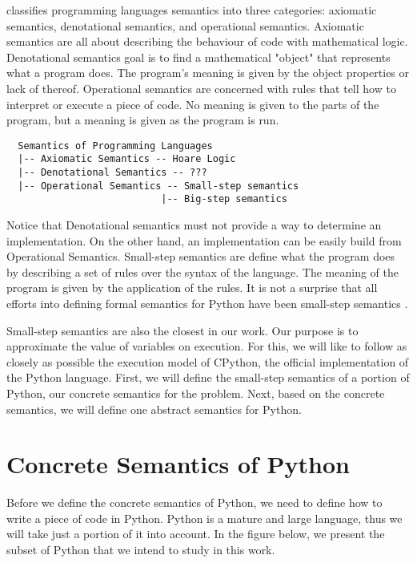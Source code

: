 \textcite{mitchell1996foundations} classifies programming
languages semantics into three categories: axiomatic semantics, denotational semantics,
and operational semantics. Axiomatic semantics are all about describing the behaviour of
code with mathematical logic. Denotational semantics goal is to find a mathematical
"object" that represents what a program does. The program's meaning is given by the
object properties or lack of thereof. Operational semantics are concerned with rules that
tell how to interpret or execute a piece of code. No meaning is given to the parts of the
program, but a meaning is given as the program is run.


\begin{verbatim}
  Semantics of Programming Languages
  |-- Axiomatic Semantics -- Hoare Logic
  |-- Denotational Semantics -- ???
  |-- Operational Semantics -- Small-step semantics
                           |-- Big-step semantics
\end{verbatim}

Notice that Denotational semantics must not provide a way to determine an implementation.
On the other hand, an implementation can be easily build from Operational Semantics.
Small-step semantics are define what the program does by describing a set of rules over
the syntax of the language. The meaning of the program is given by the application of the
rules. It is not a surprise that all efforts into defining formal semantics for Python
have been small-step semantics
\autocites{ranson_semantics_2008}{guth_formal_2013}{politz_python_2013}{fromherz_static_2018}.

Small-step semantics are also the closest in our work. Our purpose is to approximate the
value of variables on execution. For this, we will like to follow as closely as possible
the execution model of CPython, the official implementation of the Python language. First,
we will define the small-step semantics of a portion of Python, our concrete semantics
for the problem. Next, based on the concrete semantics, we will define one abstract
semantics for Python.

\section{Concrete Semantics of Python}

Before we define the concrete semantics of Python, we need to define how to write a piece
of code in Python. Python is a mature and large language, thus we will take just a portion
of it into account. In the figure below, we present the subset of Python that we intend to
study in this work.

